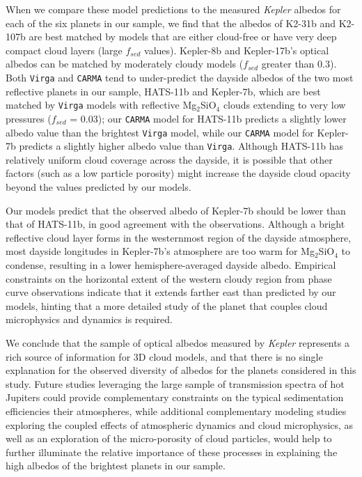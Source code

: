 \documentclass[twocolumn]{aastex63}
\begin{document}
When we compare these model predictions to the measured \emph{Kepler} albedos for each of the six planets in our sample, we find that the albedos of K2-31b and K2-107b are best matched by models that are either cloud-free or have very deep compact cloud layers (large $f_{sed}$ values). Kepler-8b and Kepler-17b's optical albedos can be matched by moderately cloudy models  ($f_{sed}$ greater than 0.3). Both \texttt{Virga} and \texttt{CARMA} tend to under-predict the dayside albedos of the two most reflective planets in our sample, HATS-11b and Kepler-7b, which are best matched by \texttt{Virga} models with reflective Mg$_2$SiO$_4$ clouds extending to very low pressures ($f_{sed}$ = 0.03); our \texttt{CARMA} model for HATS-11b predicts a slightly lower albedo value than the brightest \texttt{Virga} model, while our \texttt{CARMA} model for Kepler-7b predicts a slightly higher albedo value than \texttt{Virga}.  Although HATS-11b has relatively uniform cloud coverage across the dayside, it is possible that other factors (such as a low particle porosity) might increase the dayside cloud opacity beyond the values predicted by our models.  

Our models predict that the observed albedo of Kepler-7b should be lower than that of HATS-11b, in good agreement with the observations. Although a bright reflective cloud layer forms in the westernmost region of the dayside atmosphere, most dayside longitudes in Kepler-7b's atmosphere are too warm for Mg$_2$SiO$_4$ to condense, resulting in a lower hemisphere-averaged dayside albedo. Empirical constraints on the horizontal extent of the western cloudy region from phase curve observations indicate that it extends farther east than predicted by our models, hinting that a more detailed study of the planet that couples cloud microphysics and dynamics is required.

We conclude that the sample of optical albedos measured by \emph{Kepler} represents a rich source of information for 3D cloud models, and that there is no single explanation for the observed diversity of albedos for the planets considered in this study.  Future studies leveraging the large sample of transmission spectra of hot Jupiters could provide complementary constraints on the typical sedimentation efficiencies their atmospheres, while additional complementary modeling studies exploring the coupled effects of atmospheric dynamics and cloud microphysics, as well as an exploration of the micro-porosity of cloud particles, would help to further illuminate the relative importance of these processes in explaining the high albedos of the brightest planets in our sample.
\end{document}
